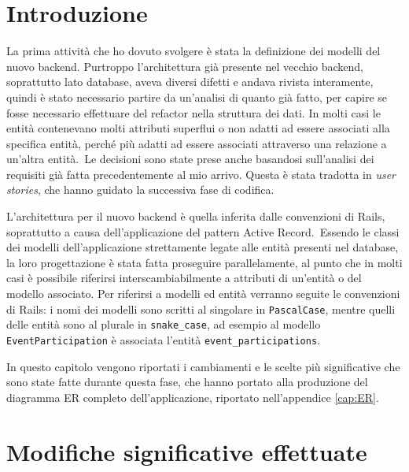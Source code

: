 \section{Introduzione}
La prima attività che ho dovuto svolgere è stata la definizione dei modelli del nuovo backend. Purtroppo l'architettura già presente nel vecchio backend, soprattutto lato database, aveva diversi difetti e andava rivista interamente, quindi è stato necessario partire da un'analisi di quanto già fatto, per capire se fosse necessario effettuare del refactor nella struttura dei dati. In molti casi le entità contenevano molti attributi superflui o non adatti ad essere associati alla specifica entità, perché più adatti ad essere associati attraverso una relazione a un'altra entità.\ Le decisioni sono state prese anche basandosi sull'analisi dei requisiti già fatta precedentemente al mio arrivo. Questa è stata tradotta in \emph{user stories}, che hanno guidato la successiva fase di codifica.

L'architettura per il nuovo backend è quella inferita dalle convenzioni di Rails, soprattutto a causa dell'applicazione del pattern Active Record.\ Essendo le classi dei modelli dell'applicazione strettamente legate alle entità presenti nel database, la loro progettazione è stata fatta proseguire parallelamente, al punto che in molti casi è possibile riferirsi interscambiabilmente a attributi di un'entità o del modello associato. Per riferirsi a modelli ed entità verranno seguite le convenzioni di Rails: i nomi dei modelli sono scritti al singolare in \verb|PascalCase|, mentre quelli delle entità sono al plurale in \verb|snake_case|, ad esempio al modello \verb|EventParticipation| è associata l'entità \verb|event_participations|.

In questo capitolo vengono riportati i cambiamenti e le scelte più significative che sono state fatte durante questa fase, che hanno portato alla produzione del diagramma ER completo dell'applicazione, riportato nell'appendice \ref{cap:ER}.

\section{Modifiche significative effettuate}
